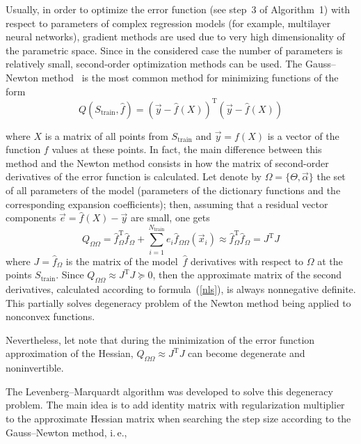\begin{multicols}{2}
\noindent
Usually, in order to optimize the error function (see step~3 of Algorithm~1) 
with respect to parameters of complex regression models (for example, multilayer 
neural networks),
gradient methods are used due to very high dimensionality of the parametric space.
Since in the considered case the number of parameters is relatively small,  
second-order optimization methods can be used.
The Gauss--Newton method~\cite{Nocedal} is the most common method for minimizing 
functions of the form
$$
Q\left({S_{\mathrm{train}}}, \hat f\right) = \left( \vec y - \hat f({X}) \right)^{\mathrm{T}} 
 \left( \vec y - \hat f({ X}) \right)
 $$
 

 
 \noindent
 where $X$ is a matrix of all points from 
 $S_{\mathrm{train}}$ and $\vec y = f(X)$ is a vector of the function $f$ values at 
 these points.  
In fact, the main difference between this method and the Newton method consists in
how the matrix of second-order derivatives of the error function is calculated.
Let denote by $\Omega = \{\Theta,\vec \alpha\}$ the set of all parameters of the model
 (parameters of the dictionary functions and the corresponding expansion coefficients); 
 then, assuming that a residual vector components $\vec e = \hat f({ X}) - \vec y$ are 
 small, one gets
\begin{equation}
  \label{nls}
  Q_{\Omega \Omega} = \hat f_{\Omega}^{\mathrm{T}} \hat f_{\Omega} + 
  \sum\limits_{i=1}^{N_{\mathrm{train}}} e_i \hat f_{\Omega \Omega} 
  \left(\vec x_i\right) \approx \hat f_{\Omega}^{\mathrm{T}} 
  \hat f_{\Omega} = {J}^{\mathrm{T}} { J}
\end{equation}
where ${J} = \hat f_{\Omega}$ is the matrix of the model~$\hat f$ derivatives with respect 
to $\Omega$ at the points $S_{\mathrm{train}}$.
Since $Q_{\Omega \Omega} \approx { J}^{\mathrm{T}} { J} \succeq 0$, then the 
approximate matrix of the second derivatives, calculated according to formula~(\ref{nls}), 
is always nonnegative definite. This partially solves degeneracy problem of the Newton method being applied to 
nonconvex functions.

Nevertheless, let note that during the minimization of the error function approximation of 
the Hessian,
 $Q_{\Omega \Omega} \approx { J}^{\mathrm{T}} { J}$ can become degenerate and noninvertible.
 {
 
 }
 
The Levenberg--Marquardt algorithm \cite{LM} was developed to solve this degeneracy problem. 
The main idea is to add identity matrix with regularization multiplier to the approximate 
Hessian matrix when searching the step size according to the Gauss--Newton method, i.\,e.,
{

}
\end{multicols}
